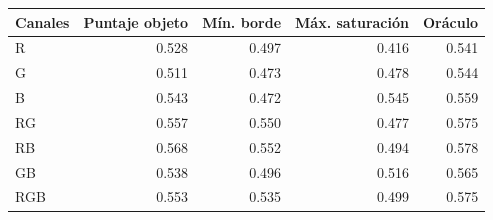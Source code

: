 \footnotesize
\begin{tabular}{lrrrr}
\toprule
Canales & Puntaje objeto & Mín. borde & Máx. saturación & Oráculo \\
\midrule
R & 0.528 & 0.497 & 0.416 & 0.541 \\
G & 0.511 & 0.473 & 0.478 & 0.544 \\
B & 0.543 & 0.472 & 0.545 & 0.559 \\
RG & 0.557 & 0.550 & 0.477 & 0.575 \\
RB & 0.568 & 0.552 & 0.494 & 0.578 \\
GB & 0.538 & 0.496 & 0.516 & 0.565 \\
RGB & 0.553 & 0.535 & 0.499 & 0.575 \\
\bottomrule
\end{tabular}
